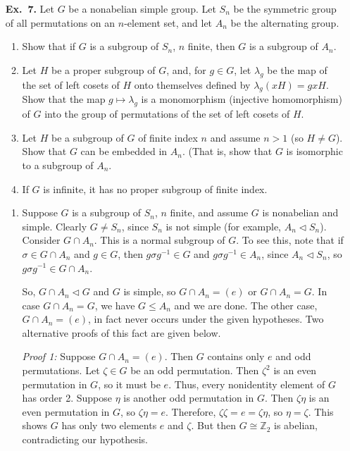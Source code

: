 \documentclass[12pt,reqno]{amsart}
\newcommand{\Z}{\ensuremath{\mathbb{Z}}}
\newcommand{\<}{\ensuremath{\langle}}
\renewcommand{\>}{\ensuremath{\rangle}}
\newcommand{\subnormal}{\ensuremath{\triangleleft}}
\begin{document}
\begin{enumerate}
\bigskip

\item[{\bf Ex.~7.}] 
    Let $G$ be a nonabelian simple group.  Let $S_n$ be the symmetric group of all
  permutations on an $n$-element set, and let $A_n$ be the alternating group.
    \begin{enumerate}[{\bf a.}]
    \item 
      Show that if $G$ is a subgroup of $S_n$, $n$ finite, then $G$ is a subgroup
      of $A_n$.
    \item Let $H$ be a proper subgroup of $G$, and, for $g\in G$, let $\lambda_g$ be
      the map of the set of left cosets of $H$ onto themselves defined by
      $\lambda_g(xH) = gxH$.  
      Show that the map $g\mapsto \lambda_g$ is a monomorphism (injective
      homomorphism) of $G$ into the group of permutations of the set of left
      cosets of $H$. 
    \item Let $H$ be a subgroup of $G$ of finite index $n$  and assume $n>1$ (so $H \neq G$).  
      Show that $G$ can be embedded in $A_n$. (That is, show that $G$ is
      isomorphic to a subgroup of $A_n$.
    \item If $G$ is infinite, it has no proper subgroup of finite index.
    \end{enumerate}

\medskip

    \begin{enumerate}
    \item Suppose $G$ is a subgroup of $S_n$, $n$ finite, and 
      assume $G$ is nonabelian and simple.  Clearly $G \neq S_n$, since $S_n$ is not simple
      (for example, $A_n \subnormal S_n$).
      Consider $G\cap A_n$. This is a normal subgroup of $G$.  To see this, note
      that if $\sigma \in G\cap A_n$ and $g\in G$, then $g\sigma g^{-1}\in G$ and
      $g\sigma g^{-1}\in A_n$, since $A_n \subnormal S_n$, so 
      $g\sigma g^{-1}\in G \cap A_n$.  
      
      So, $G\cap A_n\subnormal G$ and $G$ is simple, so $G\cap A_n = (e)$ or
      $G\cap A_n = G$.   
      In case $G\cap A_n = G$, we have $G\leq A_n$ and we are done.
      The other case, $G\cap A_n = (e)$, in fact never occurs under the given
      hypotheses. Two alternative proofs of this fact are given below.  

      {\it Proof 1:} Suppose $G\cap A_n = (e)$.  Then $G$ contains only $e$ and odd
      permutations.  
      Let $\zeta\in G$ be an odd permutation.  Then $\zeta^2$ is an even permutation in $G$, so it must
      be $e$.  Thus, every nonidentity element of $G$ has order 2.  Suppose $\eta$ is
      another odd permutation in $G$. Then $\zeta \eta$ is an even permutation in $G$, so
      $\zeta \eta = e$.  Therefore, $\zeta \zeta = e = \zeta \eta$, so $\eta = \zeta$.
      This shows $G$ has only two elements $e$ and $\zeta$.  But then $G\cong \Z_2$ is abelian,
      contradicting our hypothesis. 


\end{enumerate}
\end{enumerate}
\end{document}
